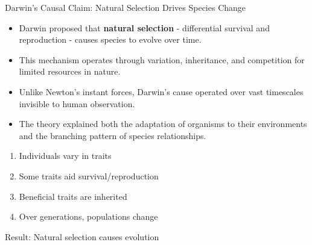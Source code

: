 \documentclass{beamer}
\begin{document}
	\begin{frame}{Darwin's Causal Claim: Natural Selection Drives Species Change}
		\begin{itemize}
			\item Darwin proposed that \textbf{natural selection} - differential survival and reproduction - causes species to evolve over time.
			\item This mechanism operates through variation, inheritance, and competition for limited resources in nature.
			\item Unlike Newton's instant forces, Darwin's cause operated over vast timescales invisible to human observation.
			\item The theory explained both the adaptation of organisms to their environments and the branching pattern of species relationships.
		\end{itemize}
		
		\begin{example}
			\begin{enumerate}
				\item Individuals vary in traits
				\item Some traits aid survival/reproduction
				\item Beneficial traits are inherited
				\item Over generations, populations change
			\end{enumerate}
			Result: Natural selection causes evolution
		\end{example}
	\end{frame}
	
\end{document}

